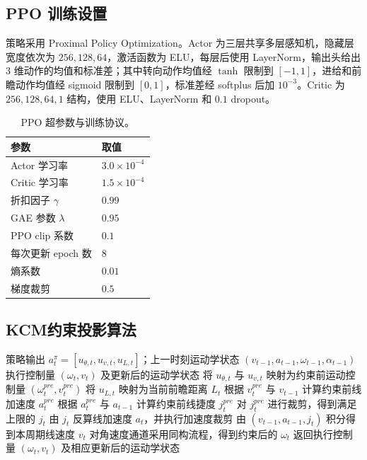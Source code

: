 \documentclass[preprint,12pt]{elsarticle}
\begin{document}
\subsection*{PPO 训练设置}
策略采用 Proximal Policy Optimization。Actor 为三层共享多层感知机，隐藏层宽度依次为 $256,128,64$，激活函数为 ELU，每层后使用 LayerNorm，输出头给出 3 维动作的均值和标准差；其中转向动作均值经 $\tanh$ 限制到 $[-1,1]$，进给和前瞻动作均值经 sigmoid 限制到 $[0,1]$，标准差经 softplus 后加 $10^{-3}$。Critic 为 $256,128,64,1$ 结构，使用 ELU、LayerNorm 和 $0.1$ dropout。

\begin{table}[H]
\centering
\caption{PPO 超参数与训练协议。}
\label{tab:appendix_ppo_params}
\small
\begin{tabular}{lp{}}
\toprule
\textbf{参数} & \textbf{取值}\\
\midrule
Actor 学习率 & $3.0\times10^{-4}$\\
Critic 学习率 & $1.5\times10^{-4}$\\
折扣因子 $\gamma$ & $0.99$\\
GAE 参数 $\lambda$ & $0.95$\\
PPO clip 系数 & $0.1$\\
每次更新 epoch 数 & $8$\\
熵系数 & $0.01$\\
梯度裁剪 & $0.5$\\

\bottomrule
\end{tabular}
\end{table}

\subsection*{KCM约束投影算法}

\begin{algorithm}[H]
\caption{KCM约束投影过程}
\label{alg:kcm}
\begin{algorithmic}[1]
\Require 策略输出 $a_t^{\pi}=[u_{\theta,t},u_{v,t},u_{L,t}]$；上一时刻运动学状态 $(v_{t-1},a_{t-1},\omega_{t-1},\alpha_{t-1})$
\Ensure 执行控制量 $(\omega_t,v_t)$ 及更新后的运动学状态
\State 将 $u_{\theta,t}$ 与 $u_{v,t}$ 映射为约束前运动控制量 $(\omega_t^{pre},v_t^{pre})$
\State 将 $u_{L,t}$ 映射为当前前瞻距离 $L_t$
\State 根据 $v_t^{pre}$ 与 $v_{t-1}$ 计算约束前线加速度 $a_t^{pre}$
\State 根据 $a_t^{pre}$ 与 $a_{t-1}$ 计算约束前线捷度 $j_t^{pre}$
\State 对 $j_t^{pre}$ 进行裁剪，得到满足上限的 $j_t$
\State 由 $j_t$ 反算线加速度 $a_t$，并执行加速度裁剪
\State 由 $(v_{t-1},a_{t-1},j_t)$ 积分得到本周期线速度 $v_t$
\State 对角速度通道采用同构流程，得到约束后的 $\omega_t$
\State 返回执行控制量 $(\omega_t,v_t)$ 及相应更新后的运动学状态
\end{algorithmic}
\end{algorithm}

\clearpage


\end{document}
